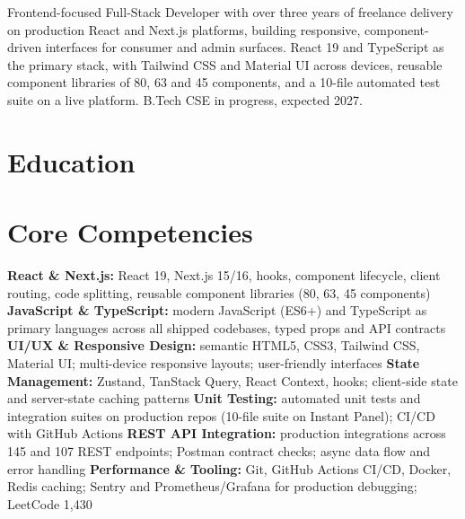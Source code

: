 \documentclass[11pt,a4paper,sans]{moderncv}
\begin{document}
\makecvtitle


\vspace{4pt}
\small{Frontend-focused Full-Stack Developer with over three years of freelance delivery on production React and Next.js platforms, building responsive, component-driven interfaces for consumer and admin surfaces. React 19 and TypeScript as the primary stack, with Tailwind CSS and Material UI across devices, reusable component libraries of 80, 63 and 45 components, and a 10-file automated test suite on a live platform. B.Tech CSE in progress, expected 2027.}


\section{Education}
\vspace{1pt}


\section{Core Competencies}
\vspace{1pt}
\raggedright
\textbf{React \& Next.js:} React 19, Next.js 15/16, hooks, component lifecycle, client routing, code splitting, reusable component libraries (80, 63, 45 components) \textbar{}
\textbf{JavaScript \& TypeScript:} modern JavaScript (ES6+) and TypeScript as primary languages across all shipped codebases, typed props and API contracts \textbar{}
\textbf{UI/UX \& Responsive Design:} semantic HTML5, CSS3, Tailwind CSS, Material UI; multi-device responsive layouts; user-friendly interfaces \textbar{}
\textbf{State Management:} Zustand, TanStack Query, React Context, hooks; client-side state and server-state caching patterns \textbar{}
\textbf{Unit Testing:} automated unit tests and integration suites on production repos (10-file suite on Instant Panel); CI/CD with GitHub Actions \textbar{}
\textbf{REST API Integration:} production integrations across 145 and 107 REST endpoints; Postman contract checks; async data flow and error handling \textbar{}
\textbf{Performance \& Tooling:} Git, GitHub Actions CI/CD, Docker, Redis caching; Sentry and Prometheus/Grafana for production debugging; LeetCode 1,430
\par\normalfont
\end{document}
